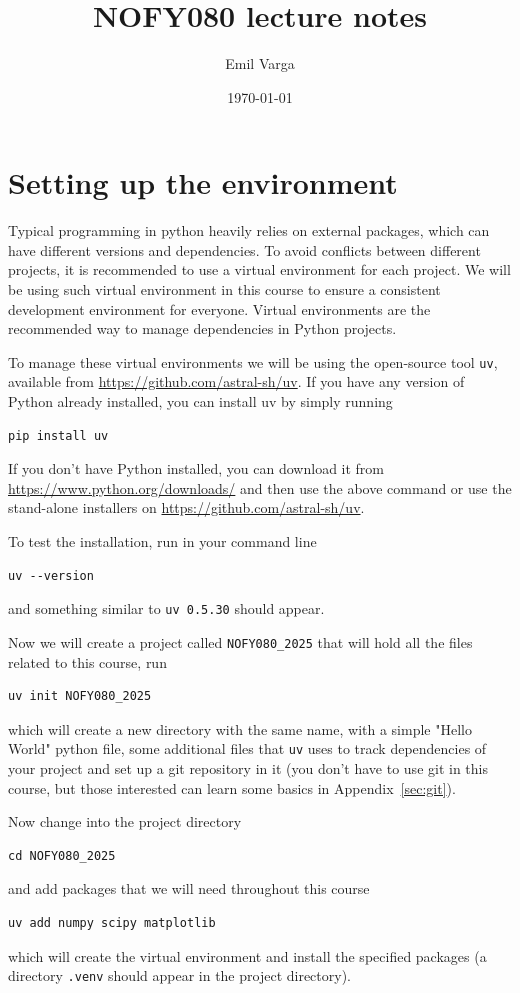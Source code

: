 \documentclass{article}
\title{NOFY080 lecture notes}
\author{Emil Varga}
\date{\today}
\begin{document}
\maketitle

\tableofcontents
\listofintermezzos
\lstlistoflistings

\newpage
\section{Setting up the environment}
Typical programming in python heavily relies on external packages, which can have different versions and dependencies. To avoid conflicts between different projects, it is recommended to use a virtual environment for each project. We will be using such virtual environment in this course to ensure a consistent development environment for everyone. Virtual environments are the recommended way to manage dependencies in Python projects.

To manage these virtual environments we will be using the open-source tool \verb|uv|, available from \url{https://github.com/astral-sh/uv}. If you have any version of Python already installed, you can install uv by simply running
\begin{lstlisting}
pip install uv
\end{lstlisting}
If you don't have Python installed, you can download it from \url{https://www.python.org/downloads/} and then use the above command or use the stand-alone installers on \url{https://github.com/astral-sh/uv}.

To test the installation, run in your command line
\begin{lstlisting}
uv --version
\end{lstlisting}
and something similar to \verb|uv 0.5.30| should appear.

Now we will create a project called \verb|NOFY080_2025| that will hold all the files related to this course, run
\begin{lstlisting}
uv init NOFY080_2025
\end{lstlisting}
which will create a new directory with the same name, with a simple "Hello World" python file, some additional files that \verb|uv| uses to track dependencies of your project and set up a git repository in it (you don't have to use git in this course, but those interested can learn some basics in Appendix~\ref{sec:git}).

Now change into the project directory
\begin{lstlisting}
cd NOFY080_2025
\end{lstlisting}
and add packages that we will need throughout this course
\begin{lstlisting}
uv add numpy scipy matplotlib
\end{lstlisting}
which will create the virtual environment and install the specified packages (a directory \verb|.venv| should appear in the project directory).
\end{document}
